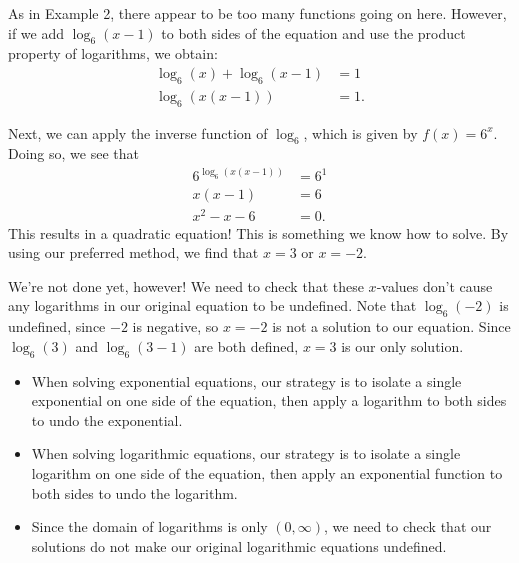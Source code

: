 \documentclass[nooutcomes]{ximera}
\begin{document}
\begin{explanation}
As in Example 2, there appear to be too many functions going on here. However, if we add $\log_6(x - 1)$ to both sides of the equation and use the product property of logarithms, we obtain:
\begin{align*}
\log_6(x) + \log_6(x - 1) & = 1 \\
\log_6(x(x - 1)) & = 1. 
\end{align*}

Next, we can apply the inverse function of $\log_6$, which is given by $f(x) = 6^x$. Doing so, we see that 
\begin{align*}
6^{\log_6(x(x - 1))} & = 6^1 \\
x(x - 1) & = 6 \\
x^2 - x - 6 & = 0.
\end{align*}
This results in a quadratic equation! This is something we know how to solve. By using our preferred method, we find that $x = 3$ or $x = -2$. 

We're not done yet, however! We need to check that these $x$-values don't cause any logarithms in our original equation to be undefined. Note that $\log_6(-2)$ is undefined, since $-2$ is negative, so $x = -2$ is not a solution to our equation. Since $\log_6(3)$ and $\log_6(3 - 1)$ are both defined, $x = 3$ is our only solution.
\end{explanation}
\begin{summary}

\begin{itemize}
\item When solving exponential equations, our strategy is to isolate a single exponential on one side of the equation, then apply a logarithm to both sides to undo the exponential. 

\item When solving logarithmic equations, our strategy is to isolate a single logarithm on one side of the equation, then apply an exponential function to both sides to undo the logarithm.

\item Since the domain of logarithms is only $(0, \infty)$, we need to check that our solutions do not make our original logarithmic equations undefined.  
\end{itemize}\end{summary}
\end{document}
